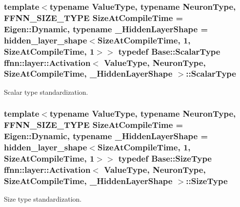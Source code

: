 \hypertarget{classffnn_1_1layer_1_1_activation_a4ca1ce43c5be7e5b8950af7cb262daca}{
\subsubsection[{Scalar\-Type}]{\setlength{\rightskip}{0pt plus 5cm}template$<$typename Value\-Type, typename Neuron\-Type, F\-F\-N\-N\-\_\-\-S\-I\-Z\-E\-\_\-\-T\-Y\-P\-E Size\-At\-Compile\-Time = Eigen\-::\-Dynamic, typename \-\_\-\-Hidden\-Layer\-Shape = hidden\-\_\-layer\-\_\-shape$<$\-Size\-At\-Compile\-Time, 1, Size\-At\-Compile\-Time, 1$>$$>$ typedef {\bf Base\-::\-Scalar\-Type} {\bf ffnn\-::layer\-::\-Activation}$<$ Value\-Type, Neuron\-Type, Size\-At\-Compile\-Time, \-\_\-\-Hidden\-Layer\-Shape $>$\-::{\bf Scalar\-Type}}}\label{classffnn_1_1layer_1_1_activation_a4ca1ce43c5be7e5b8950af7cb262daca}


Scalar type standardization. 

\hypertarget{classffnn_1_1layer_1_1_activation_a6a7b6dd86eb70b72a179ce9951fb1149}{
\subsubsection[{Size\-Type}]{\setlength{\rightskip}{0pt plus 5cm}template$<$typename Value\-Type, typename Neuron\-Type, F\-F\-N\-N\-\_\-\-S\-I\-Z\-E\-\_\-\-T\-Y\-P\-E Size\-At\-Compile\-Time = Eigen\-::\-Dynamic, typename \-\_\-\-Hidden\-Layer\-Shape = hidden\-\_\-layer\-\_\-shape$<$\-Size\-At\-Compile\-Time, 1, Size\-At\-Compile\-Time, 1$>$$>$ typedef Base\-::\-Size\-Type {\bf ffnn\-::layer\-::\-Activation}$<$ Value\-Type, Neuron\-Type, Size\-At\-Compile\-Time, \-\_\-\-Hidden\-Layer\-Shape $>$\-::{\bf Size\-Type}}}\label{classffnn_1_1layer_1_1_activation_a6a7b6dd86eb70b72a179ce9951fb1149}


Size type standardization. 



